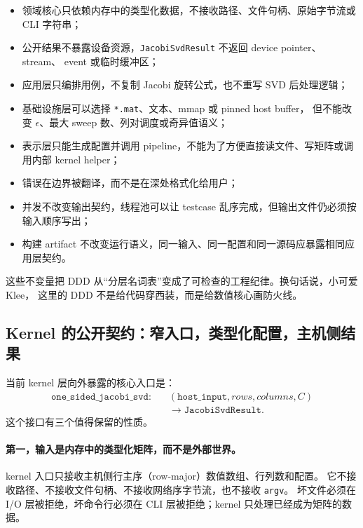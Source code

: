 \begin{itemize}
    \item 领域核心只依赖内存中的类型化数据，不接收路径、文件句柄、原始字节流或 CLI 字符串；
    \item 公开结果不暴露设备资源，\texttt{JacobiSvdResult} 不返回 device pointer、stream、
          event 或临时缓冲区；
    \item 应用层只编排用例，不复制 Jacobi 旋转公式，也不重写 SVD 后处理逻辑；
    \item 基础设施层可以选择 \texttt{*.mat}、文本、mmap 或 pinned host buffer，
          但不能改变 \(\epsilon\)、最大 sweep 数、列对调度或奇异值语义；
    \item 表示层只能生成配置并调用 pipeline，不能为了方便直接读文件、写矩阵或调用内部 kernel helper；
    \item 错误在边界被翻译，而不是在深处格式化给用户；
    \item 并发不改变输出契约，线程池可以让 testcase 乱序完成，但输出文件仍必须按输入顺序写出；
    \item 构建 artifact 不改变运行语义，同一输入、同一配置和同一源码应暴露相同应用层契约。
\end{itemize}

这些不变量把 DDD 从“分层名词表”变成了可检查的工程纪律。换句话说，小可爱 Klee，
这里的 DDD 不是给代码穿西装，而是给数值核心画防火线。

\subsection{Kernel 的公开契约：窄入口，类型化配置，主机侧结果}

当前 kernel 层向外暴露的核心入口是：
\[
    \begin{aligned}
        \texttt{one\_sided\_jacobi\_svd}:
         & \quad
        (\texttt{host\_input}, rows, columns, C) \\
         & \quad
        \longrightarrow \texttt{JacobiSvdResult}.
    \end{aligned}
\]
这个接口有三个值得保留的性质。

\paragraph{第一，输入是内存中的类型化矩阵，而不是外部世界。}
kernel 入口只接收主机侧行主序（row-major）数值数组、行列数和配置。
它不接收路径、不接收文件句柄、不接收网络序字节流，也不接收 \texttt{argv}。
坏文件必须在 I/O 层被拒绝，坏命令行必须在 CLI 层被拒绝；kernel 只处理已经成为矩阵的数据。

